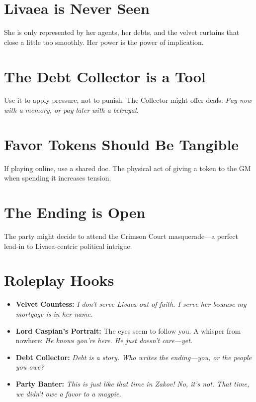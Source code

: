\documentclass[12pt]{book}
\begin{document}
\section{Livaea is Never Seen}

She is only represented by her agents, her debts, and the velvet curtains that close a little too smoothly. Her power is the power of implication.

\section{The Debt Collector is a Tool}

Use it to apply pressure, not to punish. The Collector might offer deals: \textit{Pay now with a memory, or pay later with a betrayal.}

\section{Favor Tokens Should Be Tangible}

If playing online, use a shared doc. The physical act of giving a token to the GM when spending it increases tension.

\section{The Ending is Open}

The party might decide to attend the Crimson Court masquerade---a perfect lead-in to Livaea-centric political intrigue.

\section{Roleplay Hooks}

\begin{itemize}
    \item \textbf{Velvet Countess:} \textit{I don't serve Livaea out of faith. I serve her because my mortgage is in her name.}
    \item \textbf{Lord Caspian's Portrait:} The eyes seem to follow you. A whisper from nowhere: \textit{He knows you're here. He just doesn't care---yet.}
    \item \textbf{Debt Collector:} \textit{Debt is a story. Who writes the ending---you, or the people you owe?}
    \item \textbf{Party Banter:} \textit{This is just like that time in Zakov!} \textit{No, it's not. That time, we didn't owe a favor to a magpie.}
\end{itemize}
\end{document}
